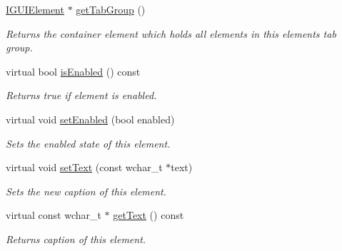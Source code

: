 \begin{DoxyCompactItemize}
\hyperlink{classirr_1_1gui_1_1IGUIElement}{I\+G\+U\+I\+Element} $\ast$ \hyperlink{classirr_1_1gui_1_1IGUIElement_ab6266a2fd3d8b0be385f9f3f3364e9ff}{get\+Tab\+Group} ()
\begin{DoxyCompactList}\small\item\em Returns the container element which holds all elements in this element\textquotesingle{}s tab group. \end{DoxyCompactList}\item 
virtual bool \hyperlink{classirr_1_1gui_1_1IGUIElement_add00898b0ee96565f55b1b47efaceec6}{is\+Enabled} () const
\begin{DoxyCompactList}\small\item\em Returns true if element is enabled. \end{DoxyCompactList}\item 
\mbox{\label{classirr_1_1gui_1_1IGUIElement_a2e3fd4a5f1ae52296f98cf36fdcffd1b}} 
virtual void \hyperlink{classirr_1_1gui_1_1IGUIElement_a2e3fd4a5f1ae52296f98cf36fdcffd1b}{set\+Enabled} (bool enabled)
\begin{DoxyCompactList}\small\item\em Sets the enabled state of this element. \end{DoxyCompactList}\item 
\mbox{\label{classirr_1_1gui_1_1IGUIElement_a8f864c26d4b2ee3551c53d3ebf870656}} 
virtual void \hyperlink{classirr_1_1gui_1_1IGUIElement_a8f864c26d4b2ee3551c53d3ebf870656}{set\+Text} (const wchar\+\_\+t $\ast$text)
\begin{DoxyCompactList}\small\item\em Sets the new caption of this element. \end{DoxyCompactList}\item 
\mbox{\label{classirr_1_1gui_1_1IGUIElement_addaba768aba8a3e9d77b8ade88f05e13}} 
virtual const wchar\+\_\+t $\ast$ \hyperlink{classirr_1_1gui_1_1IGUIElement_addaba768aba8a3e9d77b8ade88f05e13}{get\+Text} () const
\begin{DoxyCompactList}\small\item\em Returns caption of this element. \end{DoxyCompactList}\item 
\mbox{\label{classirr_1_1gui_1_1IGUIElement_a672f29f88c8d8f1e8ed1ac6c9f23b890}} 

\end{DoxyCompactItemize}
